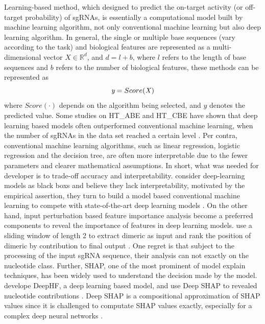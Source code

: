 \documentclass{bioinfo}
\begin{document}
Learning-based method, which designed to predict the on-target activity (or off-target probability) of sgRNAs, 
 is essentially a computational model built by machine learning algorithm, not only conventional machine learning but also deep learning algorithm. 
 In general, the single or multiple base sequences (vary according to the task) and biological features are represented as a multi-dimensional vector $X\in\mathbb{R}^d$, 
 and $d=l+b$, where $l$ refers to the length of base sequences and $b$ refers to the number of biological features, these methods can be represented as
\begin{equation}
\text{\it y}=Score(\it X)\label{eq:01}
\end{equation}
 where $Score(\cdot)$ depends on the algorithm being selected, and $y$ denotes the predicted value.
 Some studies on HT\_ABE and HT\_CBE have shown that deep learning based models often outperformed conventional machine learning, when the number of sgRNAs in the data set reached a certain level \citep{Song2020,kim2018deep,kim2019spcas9}. 
 Per contra, conventional machine learning algorithms, such as linear regression, logistic regression and the decision tree, are often more interpretable due to the fewer parameters and clearer mathematical assumptions. 
 In short, what was needed for developer is to trade-off accuracy and interpretability. 
 \citeauthor{MuhammadRafid2020} consider deep-learning models as black boxs and believe they lack interpretability, 
 motivated by the empirical assertion, they turn to build a model based conventional machine learning to compete with state-of-the-art deep learning models \citep{MuhammadRafid2020}. 
 On the other hand, input perturbation based feature importance analysis become a preferred components to reveal the importance of features in deep learning models. 
 \citeauthor{Liu2019} use a sliding window of length 2 to extract dimeric as input and rank the position of dimeric by contribution to final output \citep{Liu2019}. 
 One regret is that subject to the processing of the input sgRNA sequence, their analysis can not exactly on the nucleotide class. 
 Further, SHAP, one of the most prominent of model explain techniques, has been widely used to understand the decision made by the model. 
 \citeauthor{wang2019optimized} develope DeepHF, a deep learning based model, and use Deep SHAP to revealed nucleotide contributions \citep{wang2019optimized}. 
 Deep SHAP is a compositional approximation of SHAP values since it is challenged to computate SHAP values exactly, especially for a complex deep neural networks \citep{lundberg2017a}. 
\end{document}
